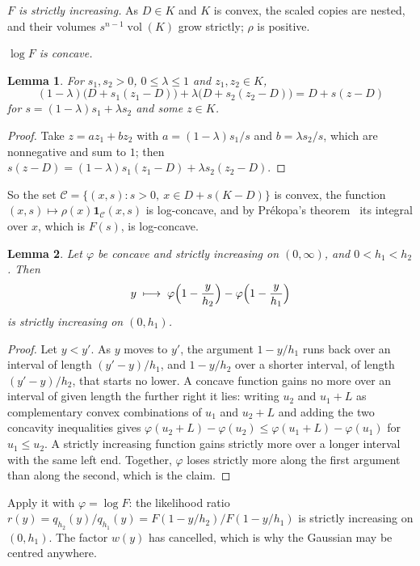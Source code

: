 \documentclass[11pt]{article}
\newtheorem{lemma}{Lemma}
\theoremstyle{remark}
\begin{document}
\emph{$F$ is strictly increasing.} As $D\in K$ and $K$ is convex, the scaled copies are nested, and their
volumes $s^{n-1}\operatorname{vol}(K)$ grow strictly; $\rho$ is positive.

\emph{$\log F$ is concave.}

\begin{lemma}\label{lem:cone}
For $s_1,s_2>0$, $0\le\lambda\le1$ and $z_1,z_2\in K$,
\[
(1-\lambda)\bigl(D+s_1(z_1-D)\bigr)+\lambda\bigl(D+s_2(z_2-D)\bigr)=D+s(z-D)
\]
for $s=(1-\lambda)s_1+\lambda s_2$ and some $z\in K$.
\end{lemma}

\begin{proof}
Take $z=a z_1+b z_2$ with $a=(1-\lambda)s_1/s$ and $b=\lambda s_2/s$, which are
nonnegative and sum to $1$; then $s(z-D)=(1-\lambda)s_1(z_1-D)+\lambda s_2(z_2-D)$.
\end{proof}

So the set $\mathcal C=\{(x,s):s>0,\ x\in D+s(K-D)\}$ is convex, the function $(x,s)\mapsto\rho(x)\mathbf
1_{\mathcal C}(x,s)$ is log-concave, and by Pr\'ekopa's theorem~\cite[Theorem~6]{Pre73} its integral over $x$,
which is $F(s)$, is log-concave.

\begin{lemma}\label{lem:ratio}
Let $\varphi$ be concave and strictly increasing on $(0,\infty)$, and $0<h_1<h_2$. Then
\[
y\;\longmapsto\;\varphi\Bigl(1-\frac y{h_2}\Bigr)-\varphi\Bigl(1-\frac y{h_1}\Bigr)
\]
is strictly increasing on $(0,h_1)$.
\end{lemma}

\begin{proof}
Let $y<y'$. As $y$ moves to $y'$, the argument $1-y/h_1$ runs back over an interval of length $(y'-y)/h_1$,
and $1-y/h_2$ over a shorter interval, of length $(y'-y)/h_2$, that starts no lower. A concave function gains
no more over an interval of given length the further right it lies: writing $u_2$ and $u_1+L$ as complementary
convex combinations of $u_1$ and $u_2+L$ and adding the two concavity inequalities gives
$\varphi(u_2+L)-\varphi(u_2)\le\varphi(u_1+L)-\varphi(u_1)$ for $u_1\le u_2$. A strictly increasing function
gains strictly more over a longer interval with the same left end. Together, $\varphi$ loses strictly more along
the first argument than along the second, which is the claim.
\end{proof}

Apply it with $\varphi=\log F$: the likelihood ratio $r(y)=q_{h_2}(y)/q_{h_1}(y)=F(1-y/h_2)/F(1-y/h_1)$ is
strictly increasing on $(0,h_1)$. The factor $w(y)$ has cancelled, which is why the Gaussian may be centred
anywhere.
\end{document}
